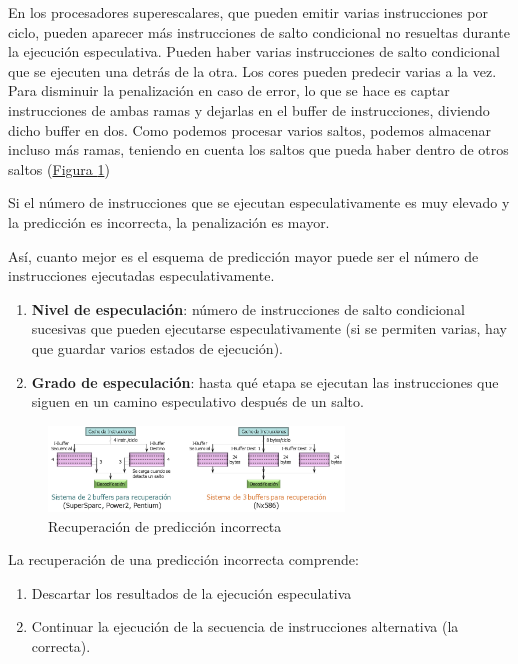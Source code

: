 \documentclass[10pt,a4paper,spanish]{report}
\begin{document}
En los procesadores superescalares, que pueden emitir varias instrucciones por ciclo, pueden aparecer más instrucciones de salto condicional no resueltas durante la ejecución especulativa. Pueden haber varias instrucciones de salto condicional que se ejecuten una detrás de la otra. Los cores pueden predecir varias a la vez. Para disminuir la penalización en caso de error, lo que se hace es captar instrucciones de ambas ramas y dejarlas en el buffer de instrucciones, diviendo dicho buffer en dos. Como podemos procesar varios saltos, podemos almacenar incluso más ramas, teniendo en cuenta los saltos que pueda haber dentro de otros saltos (\hyperref[prediccion_incorrecta]{Figura \ref*{prediccion_incorrecta}})

Si el número de instrucciones que se ejecutan especulativamente es muy elevado y la predicción es incorrecta, la penalización es mayor.

Así, cuanto mejor es el esquema de predicción mayor puede ser el número de instrucciones ejecutadas especulativamente.

\begin{enumerate}[\color{azul}{$\heartsuit$}]
    \item \textbf{\textcolor{azul}{Nivel de especulación}}: número de instrucciones de salto condicional sucesivas que pueden ejecutarse especulativamente (si se permiten varias, hay que guardar varios estados de ejecución).

    \item \textbf{\textcolor{azul}{Grado de especulación}}: hasta qué etapa se ejecutan las instrucciones que siguen en un camino especulativo después de un salto.
\end{enumerate}

\begin{figure}[!h]
\centering
\includegraphics[width=0.7\textwidth]{106}
\caption{Recuperación de predicción incorrecta}
\label{prediccion_incorrecta}
\end{figure}

La recuperación de una predicción incorrecta comprende:
\begin{enumerate}[\color{azul}{$\heartsuit$}]
    \item Descartar los resultados de la ejecución especulativa
    \item Continuar la ejecución de la secuencia de instrucciones alternativa (la correcta).
\end{enumerate}
\end{document}
